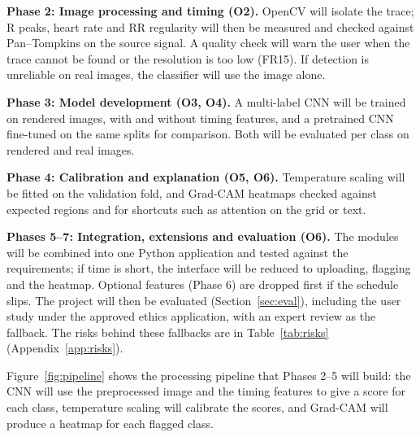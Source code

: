 \textbf{Phase 2: Image processing and timing (O2).} OpenCV will isolate the trace; R peaks, heart rate and RR regularity will then be measured and checked against Pan--Tompkins on the source signal. A quality check will warn the user when the trace cannot be found or the resolution is too low (FR15). If detection is unreliable on real images, the classifier will use the image alone.

\textbf{Phase 3: Model development (O3, O4).} A multi-label CNN will be trained on rendered images, with and without timing features, and a pretrained CNN fine-tuned on the same splits for comparison. Both will be evaluated per class on rendered and real images.

\textbf{Phase 4: Calibration and explanation (O5, O6).} Temperature scaling will be fitted on the validation fold, and Grad-CAM heatmaps checked against expected regions and for shortcuts such as attention on the grid or text.

\textbf{Phases 5--7: Integration, extensions and evaluation (O6).} The modules will be combined into one Python application and tested against the requirements; if time is short, the interface will be reduced to uploading, flagging and the heatmap. Optional features (Phase 6) are dropped first if the schedule slips. The project will then be evaluated (Section~\ref{sec:eval}), including the user study under the approved ethics application, with an expert review as the fallback. The risks behind these fallbacks are in Table~\ref{tab:risks} (Appendix~\ref{app:risks}).

Figure~\ref{fig:pipeline} shows the processing pipeline that Phases 2--5 will build: the CNN will use the preprocessed image and the timing features to give a score for each class, temperature scaling will calibrate the scores, and Grad-CAM will produce a heatmap for each flagged class.

